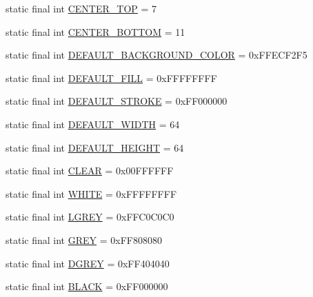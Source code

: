 \begin{DoxyCompactItemize}
\item 
static final int \hyperlink{interfacehype_1_1util_1_1_h_constants_a11e25e60dfbf2f2d578aaad41f138d6d}{C\-E\-N\-T\-E\-R\-\_\-\-T\-O\-P} = 7
\item 
static final int \hyperlink{interfacehype_1_1util_1_1_h_constants_a8667d6fd79e3d3c24f0514048869e4f1}{C\-E\-N\-T\-E\-R\-\_\-\-B\-O\-T\-T\-O\-M} = 11
\item 
static final int \hyperlink{interfacehype_1_1util_1_1_h_constants_acfbafae9559742c30815d2dfac985e70}{D\-E\-F\-A\-U\-L\-T\-\_\-\-B\-A\-C\-K\-G\-R\-O\-U\-N\-D\-\_\-\-C\-O\-L\-O\-R} = 0x\-F\-F\-E\-C\-F2\-F5
\item 
static final int \hyperlink{interfacehype_1_1util_1_1_h_constants_a008311bb77d393b2477808bd278d6999}{D\-E\-F\-A\-U\-L\-T\-\_\-\-F\-I\-L\-L} = 0x\-F\-F\-F\-F\-F\-F\-F\-F
\item 
static final int \hyperlink{interfacehype_1_1util_1_1_h_constants_a5ae9bbfeab701792749467d037157d37}{D\-E\-F\-A\-U\-L\-T\-\_\-\-S\-T\-R\-O\-K\-E} = 0x\-F\-F000000
\item 
static final int \hyperlink{interfacehype_1_1util_1_1_h_constants_adf600f12de95f70234dc8ee3c3959c4c}{D\-E\-F\-A\-U\-L\-T\-\_\-\-W\-I\-D\-T\-H} = 64
\item 
static final int \hyperlink{interfacehype_1_1util_1_1_h_constants_a890ae513fe1cb3a342370ac1184ad6ea}{D\-E\-F\-A\-U\-L\-T\-\_\-\-H\-E\-I\-G\-H\-T} = 64
\item 
static final int \hyperlink{interfacehype_1_1util_1_1_h_constants_a4bd798ceaba0e590aa35ba2f034731f5}{C\-L\-E\-A\-R} = 0x00\-F\-F\-F\-F\-F\-F
\item 
static final int \hyperlink{interfacehype_1_1util_1_1_h_constants_aeca3ea0d5f5552b6d8ebd22abdd4a587}{W\-H\-I\-T\-E} = 0x\-F\-F\-F\-F\-F\-F\-F\-F
\item 
static final int \hyperlink{interfacehype_1_1util_1_1_h_constants_acbce2f8e2c7d40f32dbc6f35c6f0f4f3}{L\-G\-R\-E\-Y} = 0x\-F\-F\-C0\-C0\-C0
\item 
static final int \hyperlink{interfacehype_1_1util_1_1_h_constants_af1d38afc78b578a34c20998836f23a0a}{G\-R\-E\-Y} = 0x\-F\-F808080
\item 
static final int \hyperlink{interfacehype_1_1util_1_1_h_constants_aed617948cfcb3b71b047a7a406c9bc8e}{D\-G\-R\-E\-Y} = 0x\-F\-F404040
\item 
static final int \hyperlink{interfacehype_1_1util_1_1_h_constants_a0e945048e9c5009900e99618444e6b59}{B\-L\-A\-C\-K} = 0x\-F\-F000000
\item 

\end{DoxyCompactItemize}
